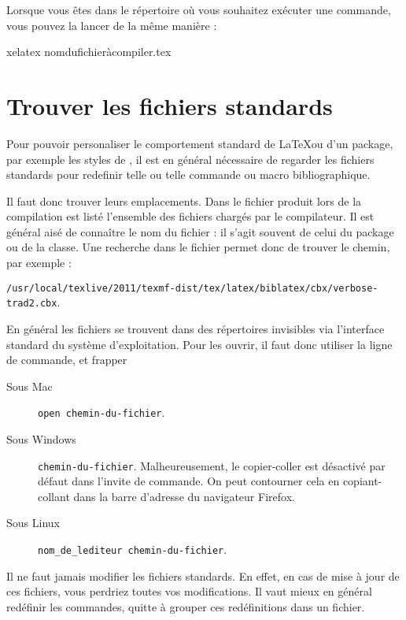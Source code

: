 Lorsque vous êtes dans le répertoire où vous souhaitez exécuter une
commande, vous pouvez la lancer de la même manière :

\begin{bashcode}
xelatex nomdufichieràcompiler.tex
\end{bashcode}

\section{Trouver les fichiers standards}\label{trouverfichier}

Pour pouvoir personaliser le comportement standard de \LaTeX ou d'un package, par exemple les styles de , il est en général nécessaire de regarder les fichiers standards pour redefinir telle ou telle commande ou macro bibliographique. 

Il faut donc trouver leurs emplacements. Dans le fichier  produit lors de la compilation est listé l'ensemble des fichiers chargés par le compilateur. Il est général aisé de connaître le nom du fichier : il s'agit souvent de celui du package ou de la classe. Une recherche dans le fichier permet donc de trouver le chemin, par exemple : 

\verb|/usr/local/texlive/2011/texmf-dist/tex/latex/biblatex/cbx/verbose-trad2.cbx|.

En général les fichiers se trouvent dans des répertoires invisibles via l'interface standard du système d'exploitation. Pour les ouvrir, il faut donc utiliser la ligne de commande, et frapper 
\begin{description}
\item[Sous Mac]\verb|open chemin-du-fichier|.
\item[Sous Windows] \verb|chemin-du-fichier|.  Malheureusement, le copier-coller est désactivé par défaut dans l'invite de commande. On peut contourner cela en copiant-collant dans la barre d'adresse du navigateur Firefox.
\item[Sous Linux] \verb|nom_de_lediteur chemin-du-fichier|.
\end{description}
\begin{attention}
Il ne faut jamais modifier les fichiers standards. En effet, en cas de mise à jour de ces fichiers, vous perdriez toutes vos modifications. Il vaut mieux en général redéfinir les commandes, quitte à grouper ces redéfinitions dans un fichier.
\end{attention}

